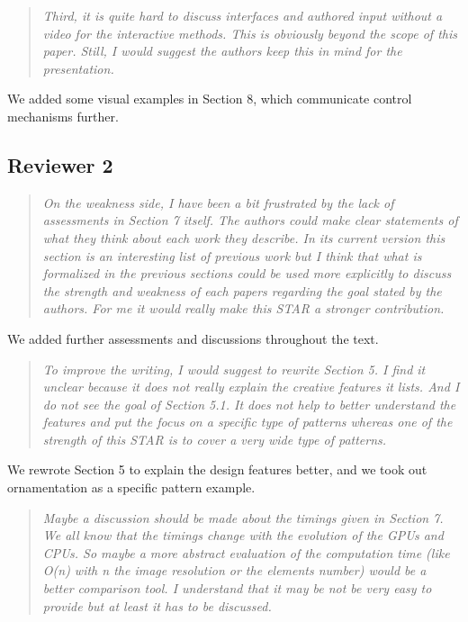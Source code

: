 \documentclass{egpubl}
\newcommand{\rev}[2]{{\color{greenrev}\textsuperscript{#1}#2}}
\renewcommand{\rev}[2]{{#2}}
\begin{document}
\begin{quote}
\emph{Third, it is quite hard to discuss interfaces and authored input without a video for the interactive methods. This is obviously beyond the scope of this paper. Still, I would suggest the authors keep this in mind for the presentation.}
\end{quote}

\rev{}{We added some visual examples in Section 8, which communicate control mechanisms further.}



\subsection*{Reviewer 2}

\begin{quote}
\emph{On the weakness side, I have been a bit frustrated by the lack of assessments in Section 7 itself. The authors could make clear statements of what they think about each work they describe. In its current version this section is an interesting list of previous work but I think that what is formalized in the previous sections could be used more explicitly to discuss the strength and weakness of each papers regarding the goal stated by the authors. 
For me it would really make this STAR a stronger contribution.}
\end{quote}

\rev{}{We added further assessments and discussions throughout the text.}


\begin{quote}
\emph{To improve the writing, I would suggest to rewrite Section 5. I find it unclear because it does not really explain the creative features it lists. And I do not see the goal of Section 5.1. It does not help to better understand the features and put the focus on a specific type of patterns whereas one of the strength of this STAR is to cover a very wide type of patterns.}
\end{quote}


\rev{}{We rewrote Section 5 to explain the design features better, and we took out ornamentation as a specific pattern example.}

\begin{quote}
\emph{Maybe a discussion should be made about the timings given in Section 7. We all know that the timings change with the evolution of the GPUs and CPUs. So maybe a more abstract evaluation of the computation time (like O(n) with n the image resolution or the elements number) would be a better comparison tool. I understand that it may be not be very easy to provide but at least it has to be discussed.}
\end{quote}
\end{document}
